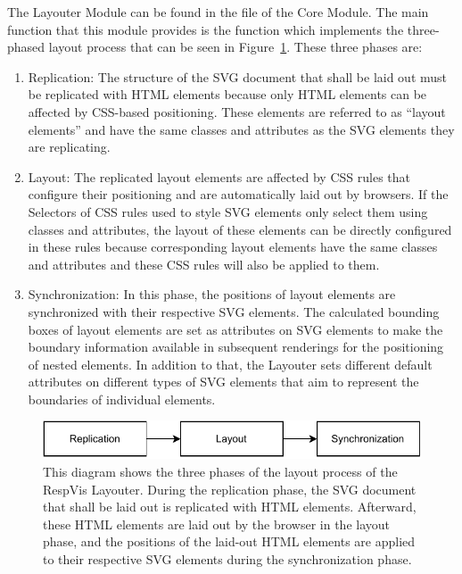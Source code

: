 The Layouter Module can be found in the  file of the
Core Module.  The main function that this module provides is the
 function which implements the three-phased
layout process that can be seen in Figure~\ref{fig:LayoutProcess}.
These three phases are:
\begin{enumerate}
\item Replication: The structure of the SVG document that shall be
  laid out must be replicated with HTML  elements because
  only HTML elements can be affected by CSS-based positioning.  These
  elements are referred to as \enquote{layout elements} and have the
  same classes and  attributes as the SVG elements they
  are replicating.

\item Layout: The replicated layout elements are affected by CSS rules
  that configure their positioning and are automatically laid out by
  browsers.  If the Selectors of CSS rules used to style SVG elements
  only select them using classes and  attributes, the
  layout of these elements can be directly configured in these rules
  because corresponding layout elements have the same classes and
   attributes and these CSS rules will also be applied to
  them.

\item Synchronization: In this phase, the positions of layout elements
  are synchronized with their respective SVG elements.  The calculated
  bounding boxes of layout elements are set as 
  attributes on SVG elements to make the boundary information
  available in subsequent renderings for the positioning of nested
  elements.  In addition to that, the Layouter sets different default
  attributes on different types of SVG elements that aim to represent
  the boundaries of individual elements.
\end{enumerate}



\begin{figure}[tp]
\centering
\includegraphics[keepaspectratio,width=\linewidth,height=\fullh]
{diagrams/respvis-layout-process.pdf}
\caption[Layout Process of the Layouter]{
This diagram shows the three phases of the layout process of the
RespVis Layouter.  During the replication phase, the SVG document that
shall be laid out is replicated with HTML  elements.
Afterward, these HTML elements are laid out by the browser in the
layout phase, and the positions of the laid-out HTML elements are
applied to their respective SVG elements during the synchronization
phase.  
}
\label{fig:LayoutProcess}
\end{figure}


